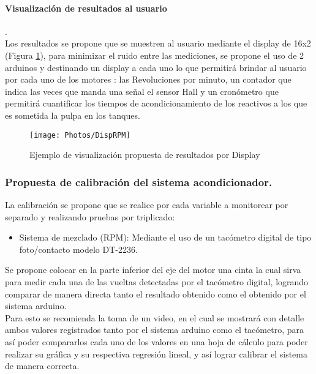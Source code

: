 \documentclass[11pt,letter
								]
								{article}
\begin{document}
	\paragraph{Visualización de resultados al usuario }.\\


Los resultados se propone que se muestren  al usuario mediante el display de 16x2 (Figura \ref{resul}),  para minimizar el ruido entre las mediciones, se propone el uso de 2 arduinos y destinando   un display a cada uno lo que permitirá brindar al usuario por cada uno de los motores : las Revoluciones por minuto, un contador que indica las veces que manda una señal el sensor Hall y un cronómetro que permitirá cuantificar  los tiempos de acondicionamiento de los reactivos a los que es sometida la pulpa en los tanques.\\


\begin{figure}[H]
\centering
\texttt{[image: Photos/DispRPM]}
\caption{Ejemplo de visualización propuesta de resultados por Display}
\label{resul}
\end{figure}


\newpage

	\subsubsection{Propuesta de calibración del sistema acondicionador.}


La calibración se propone que se realice  por cada variable a monitorear por separado y realizando pruebas por triplicado:

 
\begin{itemize}
\item Sistema de mezclado (RPM): Mediante el uso de un tacómetro digital de tipo foto/contacto modelo DT-2236.
\end{itemize}





Se propone colocar  en la parte inferior  del eje del motor una cinta la cual sirva  para medir cada una de las vueltas detectadas por el tacómetro digital, logrando comparar de manera directa tanto el resultado obtenido como el obtenido por el sistema arduino. \\

Para esto se recomienda   la toma de un video,  en el cual se mostrará con detalle ambos valores registrados tanto por el sistema arduino como el tacómetro, para así poder compararlos cada uno de los valores en  una hoja de cálculo para poder realizar su gráfica  y su respectiva regresión lineal, y así lograr  calibrar el sistema de manera correcta.\\
\end{document}
